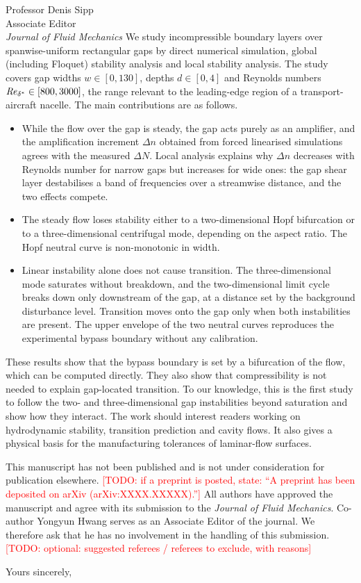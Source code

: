 \documentclass[11pt,a4paper]{letter}
\newcommand{\todo}[1]{\textcolor{red}{[TODO: #1]}}
\newcommand{\Rey}{\mbox{\textit{Re}}}
\newcommand{\AEname}{Professor Denis Sipp}
\begin{document}
\begin{letter}{\AEname\\Associate Editor\\\textit{Journal of Fluid Mechanics}}
We study incompressible boundary layers over spanwise-uniform rectangular gaps by direct numerical simulation, global (including Floquet) stability analysis and local stability analysis. The study covers gap widths $w\in[0,130]$, depths $d\in[0,4]$ and Reynolds numbers $\Rey_{\delta^*}\in[800,3000]$, the range relevant to the leading-edge region of a transport-aircraft nacelle. The main contributions are as follows.
\begin{itemize}
\item While the flow over the gap is steady, the gap acts purely as an amplifier, and the amplification increment $\Delta n$ obtained from forced linearised simulations agrees with the measured $\Delta N$. Local analysis explains why $\Delta n$ decreases with Reynolds number for narrow gaps but increases for wide ones: the gap shear layer destabilises a band of frequencies over a streamwise distance, and the two effects compete.
\item The steady flow loses stability either to a two-dimensional Hopf bifurcation or to a three-dimensional centrifugal mode, depending on the aspect ratio. The Hopf neutral curve is non-monotonic in width.
\item Linear instability alone does not cause transition. The three-dimensional mode saturates without breakdown, and the two-dimensional limit cycle breaks down only downstream of the gap, at a distance set by the background disturbance level. Transition moves onto the gap only when both instabilities are present. The upper envelope of the two neutral curves reproduces the experimental bypass boundary without any calibration.
\end{itemize}
These results show that the bypass boundary is set by a bifurcation of the flow, which can be computed directly. They also show that compressibility is not needed to explain gap-located transition. To our knowledge, this is the first study to follow the two- and three-dimensional gap instabilities beyond saturation and show how they interact. The work should interest readers working on hydrodynamic stability, transition prediction and cavity flows. It also gives a physical basis for the manufacturing tolerances of laminar-flow surfaces.

This manuscript has not been published and is not under consideration for publication elsewhere. \todo{if a preprint is posted, state: ``A preprint has been deposited on arXiv (arXiv:XXXX.XXXXX).''} All authors have approved the manuscript and agree with its submission to the \textit{Journal of Fluid Mechanics}. Co-author Yongyun Hwang serves as an Associate Editor of the journal. We therefore ask that he has no involvement in the handling of this submission. \todo{optional: suggested referees / referees to exclude, with reasons}

\closing{Yours sincerely,}

\end{letter}
\end{document}

